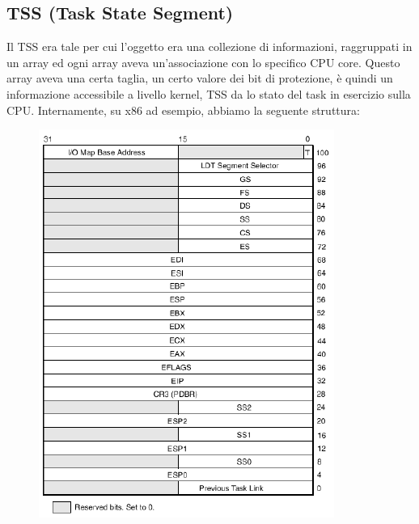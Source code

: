 \documentclass[12pt, oneside]{extbook}
\begin{document}
\subsection{TSS (Task State Segment)}
Il TSS era tale per cui l'oggetto era una collezione di informazioni, raggruppati in un array ed ogni array aveva un'associazione con lo specifico CPU core. Questo array aveva una certa taglia, un certo valore dei bit di protezione, è quindi un informazione accessibile a livello kernel, TSS da lo stato del task in esercizio sulla CPU. Internamente, su x86 ad esempio, abbiamo la seguente struttura:
\begin{figure}[!h]
	\includegraphics[scale=0.3]{immagini/tss_struct.png}
\end{figure}
\end{document}
